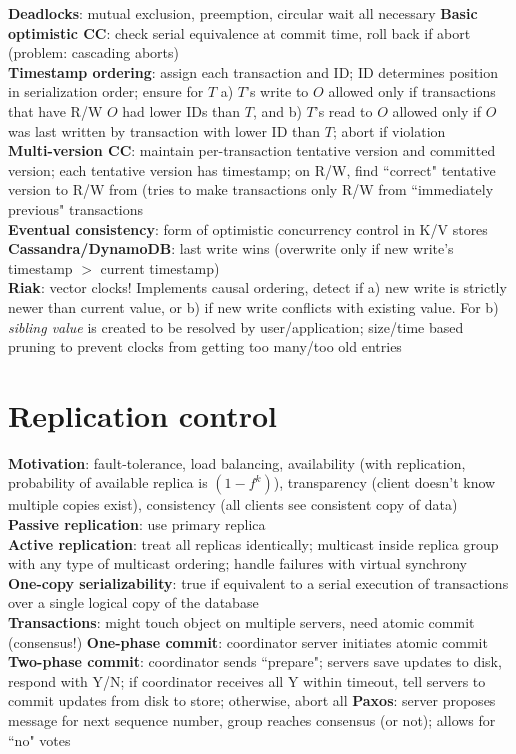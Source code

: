 \documentclass{article}
\begin{document}
\begin{multicols*}{3}
\textbf{Deadlocks}: mutual exclusion, preemption, circular wait all necessary
\textbf{Basic optimistic CC}: check serial equivalence at commit time, roll back if abort (problem: cascading aborts) \\
\textbf{Timestamp ordering}: assign each transaction and ID; ID determines position in serialization order; ensure for $T$ a) $T$'s write to $O$ allowed only if transactions that have R/W $O$ had lower IDs than $T$, and b) $T$'s read to $O$ allowed only if $O$ was last written by transaction with lower ID than $T$; abort if violation \\
\textbf{Multi-version CC}: maintain per-transaction tentative version and committed version; each tentative version has timestamp; on R/W, find ``correct" tentative version to R/W from (tries to make transactions only R/W from ``immediately previous" transactions \\
\textbf{Eventual consistency}: form of optimistic concurrency control in K/V stores
\textbf{Cassandra/DynamoDB}: last write wins (overwrite only if new write's timestamp $>$ current timestamp) \\
\textbf{Riak}: vector clocks! Implements causal ordering, detect if a) new write is strictly newer than current value, or b) if new write conflicts with existing value. For b) \textit{sibling value} is created to be resolved by user/application; size/time based pruning to prevent clocks from getting too many/too old entries

\section{Replication control}
\textbf{Motivation}: fault-tolerance, load balancing, availability (with replication, probability of available replica is $(1 - f^k)$), transparency (client doesn't know multiple copies exist), consistency (all clients see consistent copy of data) \\
\textbf{Passive replication}: use primary replica \\
\textbf{Active replication}: treat all replicas identically; multicast inside replica group with any type of multicast ordering; handle failures with virtual synchrony \\
\textbf{One-copy serializability}: true if equivalent to a serial execution of transactions over a single logical copy of the database \\
\textbf{Transactions}: might touch object on multiple servers, need atomic commit (consensus!)
\textbf{One-phase commit}: coordinator server initiates atomic commit \\
\textbf{Two-phase commit}: coordinator sends ``prepare"; servers save updates to disk, respond with Y/N; if coordinator receives all Y within timeout, tell servers to commit updates from disk to store; otherwise, abort all
\textbf{Paxos}: server proposes message for next sequence number, group reaches consensus (or not); allows for ``no" votes


\end{multicols*}
\end{document}
